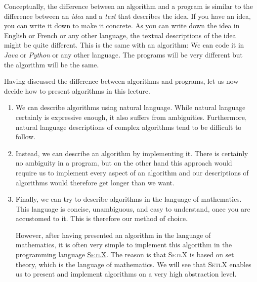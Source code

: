 Conceptually, the difference between an algorithm and a program is similar to the difference between
an \emph{idea} and a \emph{text} that describes the idea.  If you have an idea, you can write it down to
make it concrete.  As you can write down the idea in English or French or any other language, the
textual descriptions of the idea might be quite different.  This is the same with an algorithm:  We
can code it in \textsl{Java} or \textsl{Python} or any other language.  The programs will be very
different but the algorithm will be the same.

Having discussed the difference between algorithms and programs, let us now decide how to present
algorithms in this lecture.  
\begin{enumerate}
\item We can describe algorithms using natural language.  While natural language certainly is
      expressive enough, it also suffers from ambiguities.  Furthermore, natural language
      descriptions of complex algorithms tend to be difficult to follow.
\item Instead, we can describe an algorithm by implementing it.  There is certainly no ambiguity
      in a program, but on the other hand this approach would require us to implement every aspect
      of an  algorithm and our descriptions of algorithms would therefore get longer than we want.
\item Finally, we can try to describe algorithms in the language of mathematics.  This language is 
      concise, unambiguous, and easy to understand, once you are accustomed to it.  This is
      therefore our method of choice.

      However, after having presented an algorithm in the language of mathematics, it is often very
      simple to implement this algorithm in the programming language
      \href{http://randoom.org/Software/SetlX}{\textsc{SetlX}}.  The reason is 
      that \textsc{SetlX} is based on set theory, which is the language of mathematics.  We will see
      that \textsc{SetlX} enables us to present and implement algorithms on a very high abstraction level.
\end{enumerate}

